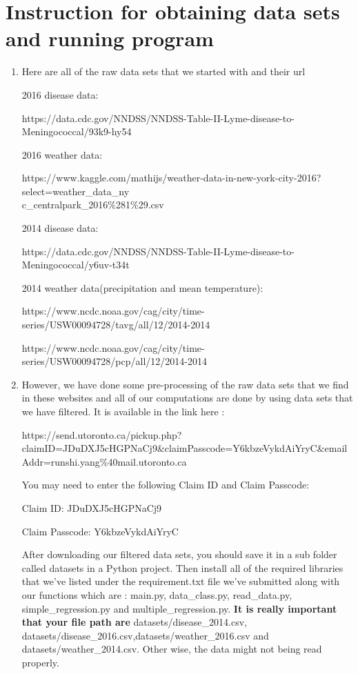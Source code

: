 \documentclass[fontsize=11pt]{article}
\begin{document}
\section*{Instruction for obtaining data sets and running program}
\begin{enumerate}
  \item Here are all of the raw data sets that we started with and their url
  
  
  2016 disease data:
  
  https://data.cdc.gov/NNDSS/NNDSS-Table-II-Lyme-disease-to-Meningococcal/93k9-hy54
  
  2016 weather data: 
  
  https://www.kaggle.com/mathijs/weather-data-in-new-york-city-2016?select=weather\_data\_ny\\c\_centralpark\_2016\%281\%29.csv
  
  2014 disease data: 
  
  https://data.cdc.gov/NNDSS/NNDSS-Table-II-Lyme-disease-to-Meningococcal/y6uv-t34t
  
  2014 weather data(precipitation and mean temperature): 
  
  https://www.ncdc.noaa.gov/cag/city/time-series/USW00094728/tavg/all/12/2014-2014 
  
  https://www.ncdc.noaa.gov/cag/city/time-series/USW00094728/pcp/all/12/2014-2014
  
  \item However, we have done some pre-processing of the raw data sets that we find in these websites and all of our computations are done by using data sets that we have filtered. It is available in the link here : 
 
 https://send.utoronto.ca/pickup.php?\\claimID=JDuDXJ5cHGPNaCj9\&claimPasscode=Y6kbzeVykdAiYryC\&emailAddr=runshi.yang\%40mail.utoronto.ca
  
 You may need to enter the following Claim ID and Claim Passcode:

Claim ID: JDuDXJ5cHGPNaCj9

Claim Passcode: Y6kbzeVykdAiYryC


 After downloading our filtered data sets, you should save it in a sub folder called datasets in a Python project. Then install all of the required libraries that we've listed under the requirement.txt file we've submitted along with our functions which are : main.py, data\_class.py, read\_data.py, simple\_regression.py and multiple\_regression.py. \textbf{It is really important that your file path are} datasets/disease\_2014.csv, \newline datasets/disease\_2016.csv,datasets/weather\_2016.csv and datasets/weather\_2014.csv. Other wise, the data might not being read properly. 
 

\end{enumerate}
\end{document}

